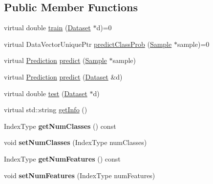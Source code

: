 \subsection*{Public Member Functions}
\begin{DoxyCompactItemize}
\item 
virtual double \hyperlink{classffactory_1_1_base_classifier_a150000cb5cd9b2bb4380b47f33a462f2}{train} (\hyperlink{classffactory_1_1_dataset}{Dataset} $\ast$d)=0
\item 
virtual Data\-Vector\-Unique\-Ptr \hyperlink{classffactory_1_1_base_classifier_a6758932ce8f59eeffd0e66404a0332e4}{predict\-Class\-Prob} (\hyperlink{classffactory_1_1_sample}{Sample} $\ast$sample)=0
\item 
virtual \hyperlink{classffactory_1_1_prediction}{Prediction} \hyperlink{classffactory_1_1_base_classifier_ab8f15f99cd827ec7425e6ec0ce5c865d}{predict} (\hyperlink{classffactory_1_1_sample}{Sample} $\ast$sample)
\item 
virtual \hyperlink{classffactory_1_1_prediction}{Prediction} \hyperlink{classffactory_1_1_base_classifier_a769d4163c4785d27703b65954d4274c0}{predict} (\hyperlink{classffactory_1_1_dataset}{Dataset} \&d)
\item 
virtual double \hyperlink{classffactory_1_1_base_classifier_a08971f48a777aae6d23485b3bb469f6f}{test} (\hyperlink{classffactory_1_1_dataset}{Dataset} $\ast$d)
\item 
virtual std\-::string \hyperlink{classffactory_1_1_base_classifier_af6b0a89fd34ba70626104500d612d836}{get\-Info} ()
\item 
\hypertarget{classffactory_1_1_base_classifier_af93c7ccaf45c41c736566b2cefcda79f}{Index\-Type {\bfseries get\-Num\-Classes} () const }\label{classffactory_1_1_base_classifier_af93c7ccaf45c41c736566b2cefcda79f}

\item 
\hypertarget{classffactory_1_1_base_classifier_acc3e3fabc05d9ffca9c2845d66ae8325}{void {\bfseries set\-Num\-Classes} (Index\-Type num\-Classes)}\label{classffactory_1_1_base_classifier_acc3e3fabc05d9ffca9c2845d66ae8325}

\item 
\hypertarget{classffactory_1_1_base_classifier_afeacbc50664a260ae78691414fcb77bb}{Index\-Type {\bfseries get\-Num\-Features} () const }\label{classffactory_1_1_base_classifier_afeacbc50664a260ae78691414fcb77bb}

\item 
\hypertarget{classffactory_1_1_base_classifier_a13da1111aa19bcb20bc14718d7eb1544}{void {\bfseries set\-Num\-Features} (Index\-Type num\-Features)}\label{classffactory_1_1_base_classifier_a13da1111aa19bcb20bc14718d7eb1544}


\end{DoxyCompactItemize}

